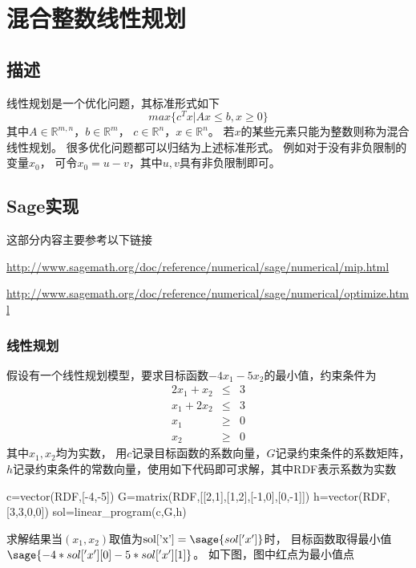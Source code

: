 \section{混合整数线性规划}
\subsection{描述}
线性规划是一个优化问题，其标准形式如下
\[max\{c^Tx|Ax\leq b,x\geq 0\}\]
其中$A\in\mathbb{R}^{m,n}$，$b\in\mathbb{R}^m$，
$c\in\mathbb{R}^n$，$x\in\mathbb{R}^n$。
若$x$的某些元素只能为整数则称为混合线性规划。
很多优化问题都可以归结为上述标准形式。
例如对于没有非负限制的变量$x_0$，
可令$x_0=u-v$，其中$u,v$具有非负限制即可。

\subsection{Sage实现}
这部分内容主要参考以下链接

\href{http://www.sagemath.org/doc/reference/numerical/sage/numerical/mip.html}{http://www.sagemath.org/doc/reference/numerical/sage/numerical/mip.html}

\href{http://www.sagemath.org/doc/reference/numerical/sage/numerical/optimize.html}{http://www.sagemath.org/doc/reference/numerical/sage/numerical/optimize.html}

\subsubsection{线性规划}
假设有一个线性规划模型，要求目标函数$-4x_1-5x_2$的最小值，约束条件为
\[
\begin{array}{rcl}
2x_1+x_2 &\leq& 3\\
x_1+2x_2 &\leq& 3\\
x_1 &\geq& 0\\
x_2 &\geq& 0
\end{array}
\]
其中$x_1,x_2$均为实数，
用$c$记录目标函数的系数向量，$G$记录约束条件的系数矩阵，
$h$记录约束条件的常数向量，使用如下代码即可求解，其中RDF表示系数为实数
\begin{sageblock}
c=vector(RDF,[-4,-5])
G=matrix(RDF,[[2,1],[1,2],[-1,0],[0,-1]])
h=vector(RDF,[3,3,0,0])
sol=linear_program(c,G,h)
\end{sageblock}
求解结果当$(x_1,x_2)$取值为$\textrm{sol['x']}=\sage{sol['x']}$时，
目标函数取得最小值$\sage{-4*sol['x'][0]-5*sol['x'][1]}$。
如下图，图中红点为最小值点



